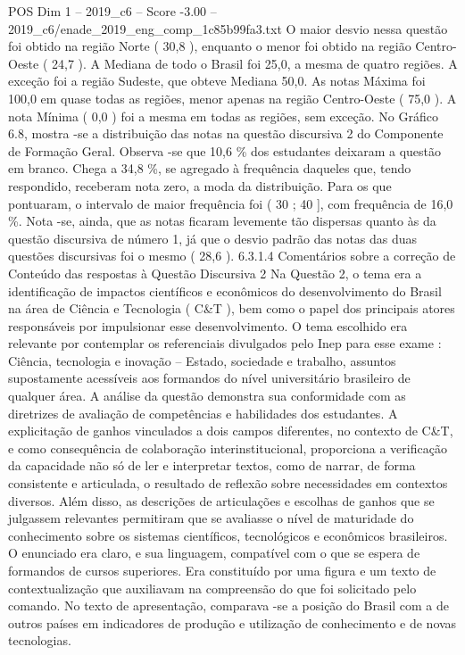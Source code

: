 \begin{textsample}{POS Dim 1 – 2019\_c6 – Score -3.00 – 2019\_c6/enade\_2019\_eng\_comp\_1c85b99fa3.txt}
O maior desvio nessa questão foi obtido na região Norte ( 30,8 ), enquanto o menor foi obtido na região Centro-Oeste ( 24,7 ).
A Mediana de todo o Brasil foi 25,0, a mesma de quatro regiões.
A exceção foi a região Sudeste, que obteve Mediana 50,0.
As notas Máxima foi 100,0 em quase todas as regiões, menor apenas na região Centro-Oeste ( 75,0 ).
A nota Mínima ( 0,0 ) foi a mesma em todas as regiões, sem exceção.
No Gráfico 6.8, mostra -se a distribuição das notas na questão discursiva 2 do Componente de Formação Geral.
Observa -se que 10,6 \% dos estudantes deixaram a questão em branco.
Chega a 34,8 \%, se agregado à frequência daqueles que, tendo respondido, receberam nota zero, a moda da distribuição.
Para os que pontuaram, o intervalo de maior frequência foi ( 30 ; 40 ], com frequência de 16,0 \%.
Nota -se, ainda, que as notas ficaram levemente tão dispersas quanto às da questão discursiva de número 1, já que o desvio padrão das notas das duas questões discursivas foi o mesmo ( 28,6 ). 6.3.1.4 Comentários sobre a correção de Conteúdo das respostas à Questão Discursiva 2 Na Questão 2, o tema era a identificação de impactos científicos e econômicos do desenvolvimento do Brasil na área de Ciência e Tecnologia ( C\&T ), bem como o papel dos principais atores responsáveis por impulsionar esse desenvolvimento.
O tema escolhido era relevante por contemplar os referenciais divulgados pelo Inep para esse exame : Ciência, tecnologia e inovação – Estado, sociedade e trabalho, assuntos supostamente acessíveis aos formandos do nível universitário brasileiro de qualquer área.
A análise da questão demonstra sua conformidade com as diretrizes de avaliação de competências e habilidades dos estudantes.
A explicitação de ganhos vinculados a dois campos diferentes, no contexto de C\&T, e como consequência de colaboração interinstitucional, proporciona a verificação da capacidade não só de ler e interpretar textos, como de narrar, de forma consistente e articulada, o resultado de reflexão sobre necessidades em contextos diversos.
Além disso, as descrições de articulações e escolhas de ganhos que se julgassem relevantes permitiram que se avaliasse o nível de maturidade do conhecimento sobre os sistemas científicos, tecnológicos e econômicos brasileiros.
O enunciado era claro, e sua linguagem, compatível com o que se espera de formandos de cursos superiores.
Era constituído por uma figura e um texto de contextualização que auxiliavam na compreensão do que foi solicitado pelo comando.
No texto de apresentação, comparava -se a posição do Brasil com a de outros países em indicadores de produção e utilização de conhecimento e de novas tecnologias.

\end{textsample}
